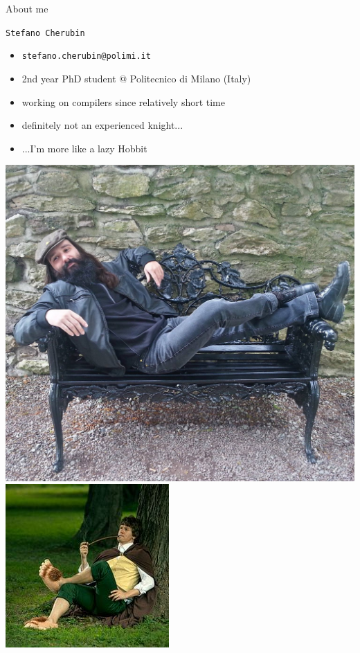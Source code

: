 \documentclass[10pt,mathserif]{beamer}
\begin{document}
\begin{frame}[t]{About me}
  \begin{huge}
    \texttt{Stefano Cherubin}
  \end{huge}
  \begin{itemize}
    \item \texttt{stefano.cherubin@polimi.it}
    \item 2nd year PhD student @ Politecnico di Milano (Italy)
    \item working on compilers since relatively short time
    \item definitely not an experienced knight...
    \pause
    \item ...I'm more like a lazy Hobbit
  \end{itemize}
  \begin{center}
    \includegraphics[height=.35\textheight]{img/00/lazy_hobbit.jpg}
    \hspace{.1\textwidth}
    \includegraphics[height=.35\textheight]{img/00/lazy_hobbit_2.jpg}
  \end{center}
\end{frame}
\end{document}
